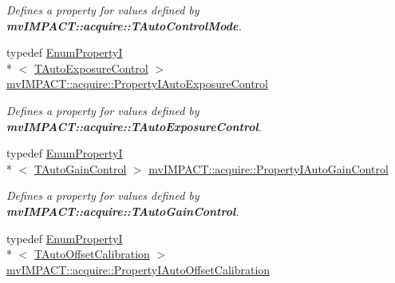 \begin{DoxyCompactItemize}
\begin{DoxyCompactList}\small\item\em Defines a property for values defined by {\bfseries mv\+I\+M\+P\+A\+C\+T\+::acquire\+::\+T\+Auto\+Control\+Mode}. \end{DoxyCompactList}\item 
\hypertarget{group___device_specific_interface_ga5223682df43da3c6e83d7c8382189d7c}{typedef \hyperlink{classmv_i_m_p_a_c_t_1_1acquire_1_1_enum_property_i}{Enum\+Property\+I}\\*
$<$ \hyperlink{group___device_specific_interface_gaa3925d7c57549537aff5ba88e4663d1a}{T\+Auto\+Exposure\+Control} $>$ \hyperlink{group___device_specific_interface_ga5223682df43da3c6e83d7c8382189d7c}{mv\+I\+M\+P\+A\+C\+T\+::acquire\+::\+Property\+I\+Auto\+Exposure\+Control}}\label{group___device_specific_interface_ga5223682df43da3c6e83d7c8382189d7c}

\begin{DoxyCompactList}\small\item\em Defines a property for values defined by {\bfseries mv\+I\+M\+P\+A\+C\+T\+::acquire\+::\+T\+Auto\+Exposure\+Control}. \end{DoxyCompactList}\item 
\hypertarget{group___device_specific_interface_ga6489a23af699da0b3a1f151c966ab906}{typedef \hyperlink{classmv_i_m_p_a_c_t_1_1acquire_1_1_enum_property_i}{Enum\+Property\+I}\\*
$<$ \hyperlink{group___device_specific_interface_ga5b3b072118cc04a2868720d230315c3a}{T\+Auto\+Gain\+Control} $>$ \hyperlink{group___device_specific_interface_ga6489a23af699da0b3a1f151c966ab906}{mv\+I\+M\+P\+A\+C\+T\+::acquire\+::\+Property\+I\+Auto\+Gain\+Control}}\label{group___device_specific_interface_ga6489a23af699da0b3a1f151c966ab906}

\begin{DoxyCompactList}\small\item\em Defines a property for values defined by {\bfseries mv\+I\+M\+P\+A\+C\+T\+::acquire\+::\+T\+Auto\+Gain\+Control}. \end{DoxyCompactList}\item 
\hypertarget{group___device_specific_interface_gac5eea380ea812d37bc6562246cdff73d}{typedef \hyperlink{classmv_i_m_p_a_c_t_1_1acquire_1_1_enum_property_i}{Enum\+Property\+I}\\*
$<$ \hyperlink{group___device_specific_interface_ga56384be04e2e0eccd6349fa8bc18d59a}{T\+Auto\+Offset\+Calibration} $>$ \hyperlink{group___device_specific_interface_gac5eea380ea812d37bc6562246cdff73d}{mv\+I\+M\+P\+A\+C\+T\+::acquire\+::\+Property\+I\+Auto\+Offset\+Calibration}}\label{group___device_specific_interface_gac5eea380ea812d37bc6562246cdff73d}


\end{DoxyCompactItemize}
